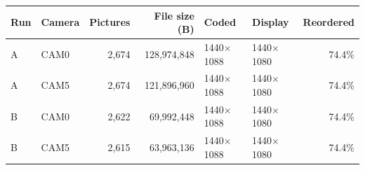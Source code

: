 \begin{tabularx}{\textwidth}{@{}llrrllr@{}}
\toprule
Run & Camera & Pictures & File size (B) & Coded & Display & Reordered \\
\midrule
A & CAM0 & 2,674 & 128,974,848 & 1440$\times$1088 & 1440$\times$1080 & 74.4\% \\
A & CAM5 & 2,674 & 121,896,960 & 1440$\times$1088 & 1440$\times$1080 & 74.4\% \\
B & CAM0 & 2,622 & 69,992,448 & 1440$\times$1088 & 1440$\times$1080 & 74.4\% \\
B & CAM5 & 2,615 & 63,963,136 & 1440$\times$1088 & 1440$\times$1080 & 74.4\% \\
\bottomrule
\end{tabularx}